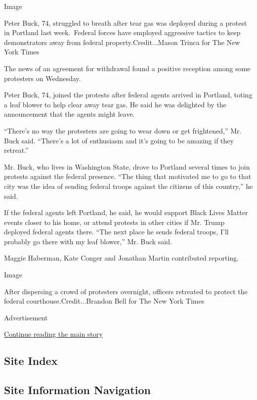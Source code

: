 Image

Peter Buck, 74, struggled to breath after tear gas was deployed during a
protest in Portland last week.~Federal forces have employed aggressive
tactics to keep demonstrators away from federal property.Credit...Mason
Trinca for The New York Times

The news of an agreement for withdrawal found a positive reception among
some protesters on Wednesday.

Peter Buck, 74, joined the protests after federal agents arrived in
Portland, toting a leaf blower to help clear away tear gas. He said he
was delighted by the announcement that the agents might leave.

``There's no way the protesters are going to wear down or get
frightened,'' Mr. Buck said. ``There's a lot of enthusiasm and it's
going to be amazing if they retreat.''

Mr. Buck, who lives in Washington State, drove to Portland several times
to join protests against the federal presence. ``The thing that
motivated me to go to that city was the idea of sending federal troops
against the citizens of this country,'' he said.

If the federal agents left Portland, he said, he would support Black
Lives Matter events closer to his home, or attend protests in other
cities if Mr. Trump deployed federal agents there. ``The next place he
sends federal troops, I'll probably go there with my leaf blower,'' Mr.
Buck said.

Maggie Haberman, Kate Conger and Jonathan Martin contributed reporting.

Image

After dispersing a crowd of protesters overnight, officers retreated to
protect the federal courthouse.Credit...Brandon Bell for The New York
Times

Advertisement

\protect\hyperlink{after-bottom}{Continue reading the main story}

\hypertarget{site-index}{%
\subsection{Site Index}\label{site-index}}

\hypertarget{site-information-navigation}{%
\subsection{Site Information
Navigation}\label{site-information-navigation}}

